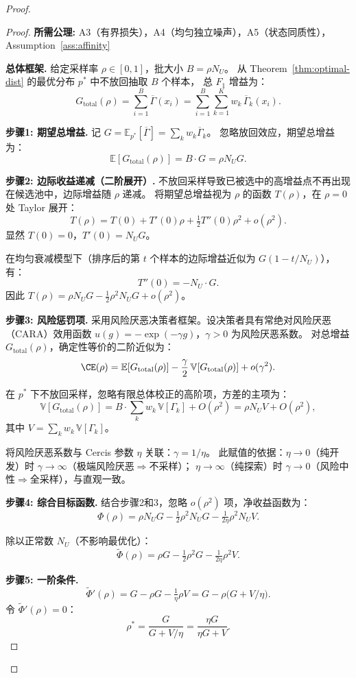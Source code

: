 \documentclass[12pt,a4paper]{article}
\newcommand{\E}{\mathbb{E}}
\newcommand{\V}{\mathbb{V}}
\begin{document}
\begin{proof}
\begin{proof}
\textbf{所需公理:} A3（有界损失），A4（均匀独立噪声），A5（状态同质性），
Assumption~\ref{ass:affinity}

\textbf{总体框架.}
给定采样率 $\rho\in[0,1]$，批大小 $B=\rho N_U$。
从 Theorem~\ref{thm:optimal-dist} 的最优分布 $p^*$ 中不放回抽取 $B$ 个样本，
总 $F_1$ 增益为：
\[
G_{\text{total}}(\rho) = \sum_{i=1}^B \overline{\Gamma}(x_i)
= \sum_{i=1}^B \sum_{k=1}^K w_k\,\overline{\Gamma}_k(x_i).
\]

\textbf{步骤1: 期望总增益.}
记 $G = \E_{p^*}[\overline{\Gamma}] = \sum_k w_k\overline{\Gamma}_k$。
忽略放回效应，期望总增益为：
\[
\E[G_{\text{total}}(\rho)] = B\cdot G = \rho N_U G.
\]

\textbf{步骤2: 边际收益递减（二阶展开）.}
不放回采样导致已被选中的高增益点不再出现在候选池中，边际增益随 $\rho$ 递减。
将期望总增益视为 $\rho$ 的函数 $T(\rho)$，在 $\rho=0$ 处 Taylor 展开：
\[
T(\rho) = T(0) + T'(0)\rho + \tfrac12 T''(0)\rho^2 + o(\rho^2).
\]
显然 $T(0)=0$，$T'(0)=N_U G$。

在均匀衰减模型下（排序后的第 $t$ 个样本的边际增益近似为 $G(1-t/N_U)$），有：
\[
T''(0) = -N_U\cdot G.
\]
因此 $T(\rho) = \rho N_U G - \tfrac12\rho^2 N_U G + o(\rho^2)$。

\textbf{步骤3: 风险惩罚项.}
采用风险厌恶决策者框架。设决策者具有常绝对风险厌恶（CARA）效用函数
$u(g)=-\exp(-\gamma g)$，$\gamma>0$ 为风险厌恶系数。
对总增益 $G_{\text{total}}(\rho)$，确定性等价的二阶近似为：
\[
\CE(\rho) = \E[G_{\text{total}}(\rho)] - \frac\gamma2\,\V[G_{\text{total}}(\rho)] + o(\gamma^2).
\]

在 $p^*$ 下不放回采样，忽略有限总体校正的高阶项，方差的主项为：
\[
\V[G_{\text{total}}(\rho)] = B\cdot\sum_k w_k\,\V[\Gamma_k] + O(\rho^2)
= \rho N_U V + O(\rho^2),
\]
其中 $V = \sum_k w_k\,\V[\Gamma_k]$。

将风险厌恶系数与 Cercis 参数 $\eta$ 关联：$\gamma = 1/\eta$。
此赋值的依据：$\eta\to0$（纯开发）时 $\gamma\to\infty$（极端风险厌恶$\Rightarrow$不采样）；
$\eta\to\infty$（纯探索）时 $\gamma\to0$（风险中性$\Rightarrow$全采样），与直观一致。

\textbf{步骤4: 综合目标函数.}
结合步骤2和3，忽略 $o(\rho^2)$ 项，净收益函数为：
\[
\Phi(\rho) = \rho N_U G - \tfrac12\rho^2 N_U G - \tfrac1{2\eta}\rho^2 N_U V.
\]

除以正常数 $N_U$（不影响最优化）：
\[
\tilde\Phi(\rho) = \rho G - \tfrac12\rho^2 G - \tfrac1{2\eta}\rho^2 V.
\]

\textbf{步骤5: 一阶条件.}
\[
\tilde\Phi'(\rho) = G - \rho G - \tfrac1\eta\rho V
= G - \rho\big(G + V/\eta\big).
\]
令 $\tilde\Phi'(\rho)=0$：
\[
\rho^* = \frac{G}{G + V/\eta}
= \frac{\eta G}{\eta G + V}.
\]


\end{proof}
\end{proof}
\end{document}
